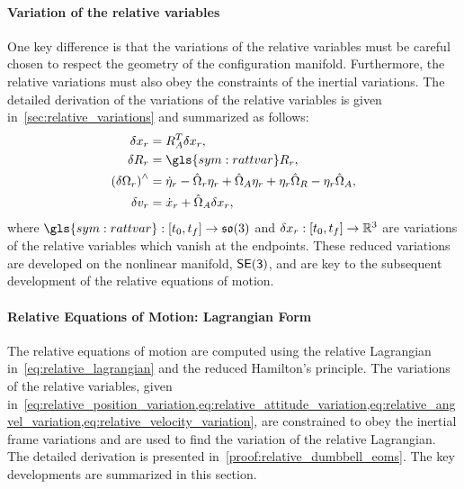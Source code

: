 \paragraph{Variation of the relative variables}\label{ssec:var_rel_lagrangian}

One key difference is that the variations of the relative variables must be careful chosen to respect the geometry of the configuration manifold.
Furthermore, the relative variations must also obey the constraints of the inertial variations.
The detailed derivation of the variations of the relative variables is given in~\cref{sec:relative_variations} and summarized as follows:
\begin{align}
    \delta \rpos &= \aatt^T \delta \rpos,\label{eq:relative_position_variation} \\
    \delta \ratt &= \gls{sym:rattvar} \ratt,\label{eq:relative_attitude_variation}\\
    \parenth{\delta \rangvel}^\wedge&= \dot{\eta}_r - \hat{\Omega}_r \rattvar + \hat{\Omega}_A \rattvar + \rattvar \hat{\Omega}_R - \rattvar \hat{\Omega}_A, \label{eq:relative_angvel_variation}\\
    \delta \rvel &= \dot{x}_r + \hat{\Omega}_A \delta \rpos,\label{eq:relative_velocity_variation}
\end{align}
where \( \gls{sym:rattvar} : \bracket{t_0, t_f} \to \so \) and \( \delta x_r : \left[ t_0, t_f \right] \to \mathbb{R}^3 \) are variations of the relative variables which vanish at the endpoints.
These reduced variations are developed on the nonlinear manifold, \( \mathsf{SE(3)} \), and are key to the subsequent development of the relative equations of motion.

\paragraph{Relative Equations of Motion: Lagrangian Form}
The relative equations of motion are computed using the relative Lagrangian in~\cref{eq:relative_lagrangian} and the reduced Hamilton's principle.
The variations of the relative variables, given in~\cref{eq:relative_position_variation,eq:relative_attitude_variation,eq:relative_angvel_variation,eq:relative_velocity_variation}, are constrained to obey the inertial frame variations and are used to find the variation of the relative Lagrangian.
The detailed derivation is presented in~\cref{proof:relative_dumbbell_eoms}.
The key developments are summarized in this section.

